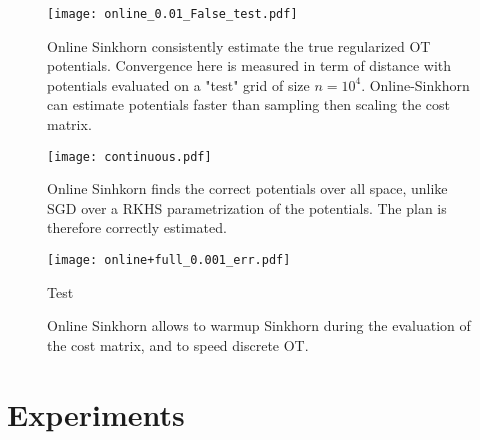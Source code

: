 \begin{figure}[t]
    \centering
    \texttt{[image: online\_0.01\_False\_test.pdf]}
    \caption{Online Sinkhorn consistently estimate the true regularized OT potentials. Convergence here is measured in term of distance with potentials evaluated on a "test" grid of size $n=10^4$. Online-Sinkhorn can estimate potentials faster than sampling then scaling the cost matrix.}
    \label{fig:potentials}
\end{figure}

\begin{figure}[t]
    \centering
    \texttt{[image: continuous.pdf]}
    \caption{Online Sinhkorn finds the correct potentials over all space, unlike SGD over a RKHS parametrization of the potentials. The plan is therefore correctly estimated.}
    \label{fig:potentials}
\end{figure}

\begin{figure}[t]
    \begin{minipage}{.7\textwidth}
    \texttt{[image: online+full\_0.001\_err.pdf]}
    \caption{Online Sinkhorn allows to warmup Sinkhorn during the evaluation of the cost matrix, and to speed discrete OT.}
    \label{fig:potentials}
    \end{minipage}%
    \begin{minipage}{.29\textwidth}Test
    \end{minipage}
\end{figure}

\section{Experiments}\label{sec:exps}



